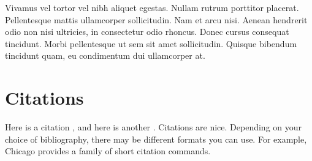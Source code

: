 Vivamus vel tortor vel nibh aliquet egestas. Nullam rutrum porttitor placerat.
Pellentesque mattis ullamcorper sollicitudin. Nam et arcu nisi. Aenean hendrerit
odio non nisi ultricies, in consectetur odio rhoncus. Donec cursus consequat
tincidunt. Morbi pellentesque ut sem sit amet sollicitudin. Quisque bibendum
tincidunt quam, eu condimentum dui ullamcorper at.

\section{Citations}

Here is a citation \cite{fake1}, and here is another \cite{fake2}. Citations are
nice. Depending on your choice of bibliography, there may be different formats
you can use. For example, Chicago provides a family of short citation commands.
